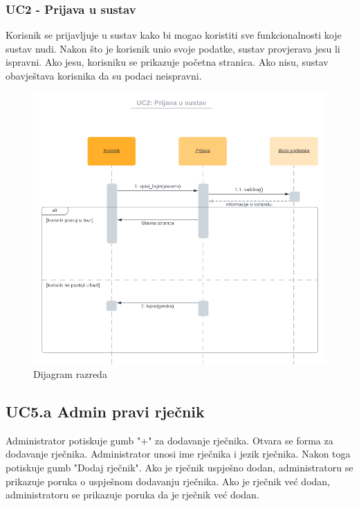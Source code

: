 					\subsubsection{UC2 - Prijava u sustav}

					Korisnik se prijavljuje u sustav kako bi mogao koristiti sve funkcionalnosti koje sustav nudi. Nakon što je korisnik unio svoje podatke, sustav provjerava jesu li ispravni. Ako jesu, korisniku se prikazuje početna stranica. Ako nisu, sustav obavještava korisnika da su podaci neispravni.\\
					
				\begin{figure}[H]
					\includegraphics[scale=0.5]{dijagrami/UC2.png} 
					\centering
					\caption{Dijagram razreda}
					\label{fig:class_diagram}
				\end{figure}	
				\eject

				\subsection*{UC5.a Admin pravi rječnik}

				Administrator potiskuje gumb "+" za dodavanje rječnika. Otvara se forma za dodavanje rječnika. Administrator unosi ime rječnika i jezik rječnika. Nakon toga potiskuje gumb "Dodaj rječnik". Ako je rječnik uspješno dodan, administratoru se prikazuje poruka o uspješnom dodavanju rječnika. Ako je rječnik već dodan, administratoru se prikazuje poruka da je rječnik već dodan.\\

